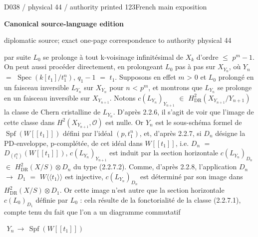 \documentclass[9pt]{article}
\newcommand{\CanonText}[1]{\par{\fontsize{8.0}{9.35}\selectfont\RaggedRight #1\par}\vspace{2.2pt}}
\newenvironment{CanonMathBlock}{\par\vspace{1.2pt}\begin{center}\fontsize{6.8}{8.0}\selectfont\(\displaystyle}{\)\end{center}\vspace{1.2pt}}
\newcommand{\LayerTitle}{Canonical source-language edition}
\begin{document}
\noindent\begin{minipage}[t][\dimexpr\textheight-5pt\relax][t]{\textwidth}
{\sffamily\fontsize{7.3}{8.2}\selectfont\color{Quiet} D038 / physical 44 / authority printed 123\hfill French main exposition}
\par{}\vspace{4.5pt}
{\sffamily\fontsize{10.4}{11.6}\selectfont\bfseries\color{Accent} \LayerTitle}
\par{\sffamily\fontsize{6.7}{7.7}\selectfont\color{Quiet} diplomatic source; exact one-page correspondence to authority physical 44}
\vspace{5pt}
\CanonText{par suite \(L_{0}\) se prolonge à tout k-voisinage infinitésimal de \(X_{k}\) d'ordre \(\leq{}\) \(p^{m}-1\). On peut aussi procéder directement, en prolongeant \(L_{0}\) pas à pas sur \(X_{Y_{n}}\), où \(Y_{n}\) \(=\) \(\operatorname{Spec}(k[t_{1}]/t_{1}^{n})\), \(q_{1}-1\) \(=\) \(t_{1}\). Supposons en effet \(m\) > 0 et \(L_{0}\) prolongé en un faisceau inversible \(L_{Y_{n}}\) sur \(X_{Y_{n}}\) pour \(n\) < \(p^{m}\), et montrons que \(L_{Y_{n}}\) se prolonge en un faisceau inversible sur \(X_{Y_{n+1}}\). Notons \(c(L_{Y_{n}})_{Y_{n+1}}\) \(\in{}\) \(H^{2}_{\mathrm{DR}}(X_{Y_{n+1}}/Y_{n+1})\) la classe de Chern cristalline de \(L_{Y_{n}}\). D'après 2.2.6, il s'agit de voir que l'image de cette classe dans \(H^{2}(X_{Y_{n+1}},\mathcal{O})\) est nulle. Or \(Y_{n}\) est le sous-schéma formel de \(\operatorname{Spf}(W[[t_{1}]])\) défini par l'idéal \((p,t_{1}^{n})\), et, d'après 2.2.7, si \(D_{n}\) désigne la PD-enveloppe, p-complétée, de cet idéal dans \(W[[t_{1}]]\), i.e. \(D_{n}\) \(=\) \(D_{(t_{1}^{n})}(W[[t_{1}]])\), \(c(L_{Y_{n}})_{Y_{n+1}}\) est induit par la section horizontale \(c(L_{Y_{n}})_{D_{n}}\) \(\in{}\) \(H^{2}_{\mathrm{DR}}(X/S)\otimes{}D_{n}\) du type (2.2.7.2). Comme, d'après 2.2.8, l'application \(D_{n}\) \(\to{}\) \(D_{1}\) \(=\) \(W\langle{}\langle{}t_{1}\rangle{}\rangle{}\) est injective, \(c(L_{Y_{n}})_{D_{n}}\) est déterminé par son image dans \(H^{2}_{\mathrm{DR}}(X/S)\otimes{}D_{1}\). Or cette image n'est autre que la section horizontale \(c(L_{0})_{D_{1}}\) définie par \(L_{0}\) : cela résulte de la fonctorialité de la classe (2.2.7.1), compte tenu du fait que l'on a un diagramme commutatif}
\begin{CanonMathBlock}
\begin{array}{ccc}
Y_{n}\,\longrightarrow{}\,\operatorname{Spf}(W[[t_{1}]]) & {} & {}\\

\end{array}
\end{CanonMathBlock}
\end{minipage}
\end{document}

